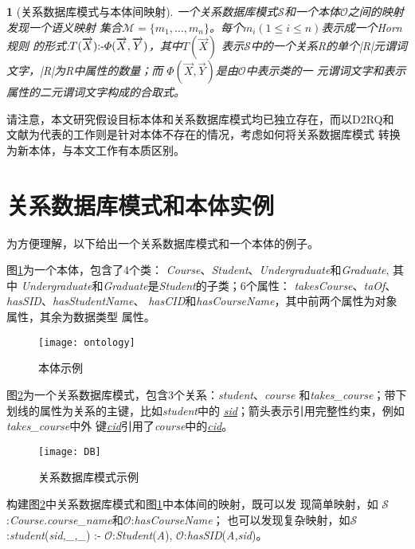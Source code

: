 \newtheorem{defn}{}
\begin{defn}[关系数据库模式与本体间映射]
一个关系数据库模式$\mathcal{S}$和一个本体$\mathcal{O}$之间的映射发现一个语义映射
集合$\mathcal{M}=\{m_1,\ldots,m_n\}$。每个$m_i(1 \le i\le n)$表示成一个Horn规则
的形式:$T(\overrightarrow{X}) \mbox{\rm:-} \varPhi (\overrightarrow{X},
\overrightarrow{Y}) $，其中$T(\overrightarrow{X})$
表示$\mathcal{S}$中的一个关系R的单个|R|元谓词文字，|R|为R中属性的数量；而
$\varPhi (\overrightarrow{X},\overrightarrow{Y})$是由$\mathcal{O}$中表示类的一
元谓词文字和表示属性的二元谓词文字构成的合取式。
\end{defn}

请注意，本文研究假设目标本体和关系数据库模式均已独立存在，而以D2RQ\cite{11}和
文献\cite{12,13}为代表的工作则是针对本体不存在的情况，考虑如何将关系数据库模式
转换为新本体，与本文工作有本质区别。

\section{关系数据库模式和本体实例}
为方便理解，以下给出一个关系数据库模式和一个本体的例子。

图\ref{fig:onto}为一个本体，包含了4个类：
\emph{Course}、\emph{Student}、\emph{Undergraduate}和\emph{Graduate}, 其中
\emph{Undergraduate}和\emph{Graduate}是\emph{Student}的子类；6个属性：
\emph{takesCourse}、\emph{taOf}、\emph{hasSID}、\emph{hasStudentName}、
\emph{hasCID}和\emph{hasCourseName}，其中前两个属性为对象属性，其余为数据类型
属性。


\begin{figure}[htbp]
\centerline{\texttt{[image: ontology]}}
\caption{本体示例}
\label{fig:onto}
\end{figure}

图\ref{fig:db}为一个关系数据库模式，包含3个关系：\emph{student}、\emph{course}
和\emph{takes\_course}；带下划线的属性为关系的主键，比如\emph{student}中的
\emph{\underline{sid}}；箭头表示引用完整性约束，例如\emph{takes\_course}中外
键\emph{\underline{cid}}引用了\emph{course}中的\emph{\underline{cid}}。

\begin{figure}[htbp]
\centerline{\texttt{[image: DB]}}
\caption{关系数据库模式示例}
\label{fig:db}
\end{figure}


构建图\ref{fig:db}中关系数据库模式和图\ref{fig:onto}中本体间的映射，既可以发
现简单映射，如
$\mathcal{S}$:\emph{Course.course\_name}和$\mathcal{O}$:\emph{hasCourseName}；
也可以发现复杂映射，如$\mathcal{S}$:\emph{student}(\emph{sid,\_,\_}) 
:- $\mathcal{O}$:\emph{Student}(\emph{A}),
 $\mathcal{O}$:\emph{hasSID}(\emph{A,sid})。


